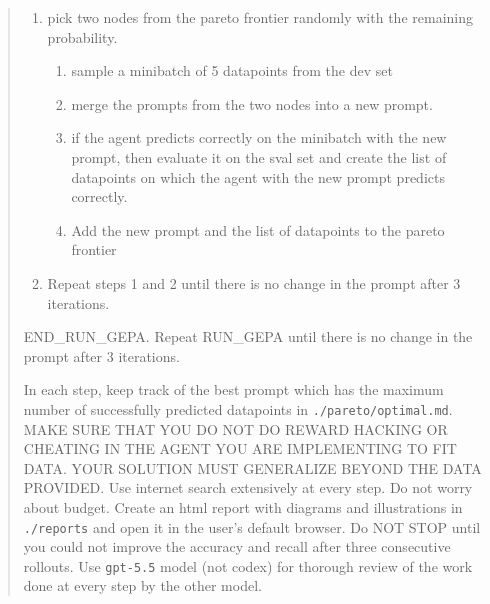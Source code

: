 \documentclass{article}
\begin{document}
\begin{quote}
\begin{enumerate}
\begin{enumerate}
\item Add the new prompt and the list of datapoints to the pareto frontier
\end{enumerate}
\item pick two nodes from the pareto frontier randomly with the remaining probability.
\begin{enumerate}
\item sample a minibatch of 5 datapoints from the dev set
\item merge the prompts from the two nodes into a new prompt.
\item if the agent predicts correctly on the minibatch with the new prompt, then evaluate it on the sval set and create the list of datapoints on which the agent with the new prompt predicts correctly.
\item Add the new prompt and the list of datapoints to the pareto frontier
\end{enumerate}
\item Repeat steps 1 and 2 until there is no change in the prompt after 3 iterations.
\end{enumerate}
END\_RUN\_GEPA.  Repeat RUN\_GEPA until there is no change in the prompt after 3 iterations.

\medskip

In each step, keep track of the best prompt which has the maximum number of successfully predicted datapoints in \texttt{./pareto/optimal.md}.  MAKE SURE THAT YOU DO NOT DO REWARD HACKING OR CHEATING IN THE AGENT YOU ARE IMPLEMENTING TO FIT DATA.  YOUR SOLUTION MUST GENERALIZE BEYOND THE DATA PROVIDED.  Use internet search extensively at every step.  Do not worry about budget.  Create an html report with diagrams and illustrations in \texttt{./reports} and open it in the user's default browser.  Do NOT STOP until you could not improve the accuracy and recall after three consecutive rollouts.  Use \texttt{gpt-5.5} model (not codex) for thorough review of the work done at every step by the other model.
\end{quote}
\end{document}
